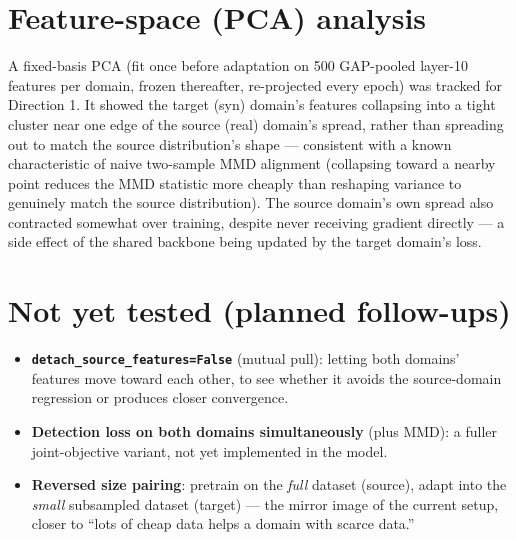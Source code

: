 \documentclass[11pt]{article}
\begin{document}
\section{Feature-space (PCA) analysis}

A fixed-basis PCA (fit once before adaptation on 500 GAP-pooled layer-10 features per domain,
frozen thereafter, re-projected every epoch) was tracked for Direction 1. It showed the target
(syn) domain's features collapsing into a tight cluster near one edge of the source (real)
domain's spread, rather than spreading out to match the source distribution's shape ---
consistent with a known characteristic of naive two-sample MMD alignment (collapsing toward a
nearby point reduces the MMD statistic more cheaply than reshaping variance to genuinely match
the source distribution). The source domain's own spread also contracted somewhat over training,
despite never receiving gradient directly --- a side effect of the shared backbone being updated
by the target domain's loss.

\section{Not yet tested (planned follow-ups)}

\begin{itemize}
    \item \textbf{\texttt{detach\_source\_features=False}} (mutual pull): letting both domains'
    features move toward each other, to see whether it avoids the source-domain regression or
    produces closer convergence.
    \item \textbf{Detection loss on both domains simultaneously} (plus MMD): a fuller
    joint-objective variant, not yet implemented in the model.
    \item \textbf{Reversed size pairing}: pretrain on the \emph{full} dataset (source), adapt
    into the \emph{small} subsampled dataset (target) --- the mirror image of the current setup,
    closer to ``lots of cheap data helps a domain with scarce data.''
\end{itemize}
\end{document}
